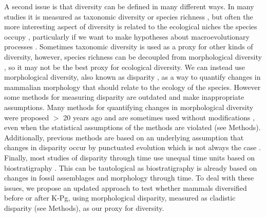 \documentclass[12pt,letterpaper]{article}
\begin{document}
A second issue is that diversity can be defined in many different ways.
In many studies it is measured as taxonomic diversity or species richness \citep{Stadler12042011,meredithimpacts2011,O'Leary08022013}, but often the more interesting aspect of diversity is related to the ecological niches the species occupy \citep{Wesley-Hunt2005,Brusatte12092008,toljagictriassic-jurassic2013}, particularly if we want to make hypotheses about macroevolutionary processes \citep{Pearman2008149,OlsonRadiation,Losos2010,glor2010phylogenetic,benton2015}.
Sometimes taxonomic diversity is used as a proxy for other kinds of diversity, however, species richness can be decoupled from morphological diversity \citep[e.g.][]{slaterCetacean,ruta2013,hopkinsdecoupling2013}, so it may not be the best proxy for ecological diversity.
We can instead use morphological diversity, also known as disparity \citep[e.g.][]{Wills1994,Erwin2007,Hughes20082013}, as a way to quantify changes in mammalian morphology that should relate to the ecology of the species.
However some methods for measuring disparity are outdated and make inappropriate assumptions.
Many methods for quantifying changes in morphological diversity were proposed $>$ 20 years ago \citep{Foote01071994,Wills1994} and are sometimes used without modifications \citep[e.g.,][]{brusatte50,Brusatte12092008,cisneros2010,thorneresetting2011,prentice2011,brusattedinosaur2012,toljagictriassic-jurassic2013,ruta2013,bentonmodels2014,bensonfaunal2014}, even when the statistical assumptions of the methods are violated (see Methods).
Additionally, previous methods are based on an underlying assumption that changes in disparity occur by punctuated evolution \citep[e.g.][]{Wesley-Hunt2005} which is not always the case \citep{Hunt21042015}.
Finally, most studies of disparity through time use unequal time units based on biostratigraphy \citep{Brusatte12092008,brusattedinosaur2012,toljagictriassic-jurassic2013}. 
This can be tautological as biostratigraphy is already based on changes in fossil assemblages and morphology through time.
To deal with these issues, we propose an updated approach to test whether mammals diversified before or after K-Pg, using morphological disparity, measured as cladistic disparity (see Methods), as our proxy for diversity.
\end{document}
